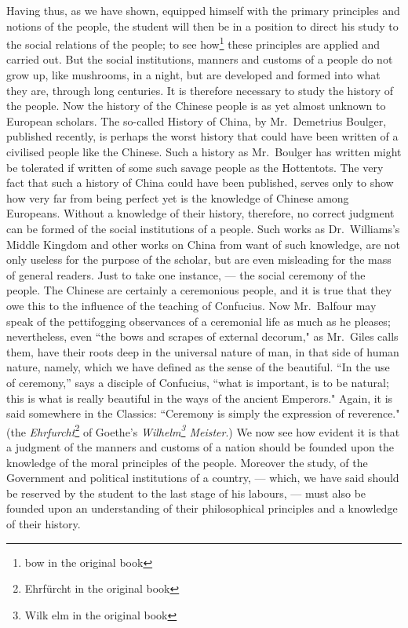 Having thus, as we have shown, equipped himself with the primary principles and notions of the people, the student will then be in a position to direct his study to the social relations of the people; to see how\footnote{bow in the original book} these principles are applied and carried out. 
But the social institutions, manners and customs of a people do not grow up, like mushrooms, in a night, but are developed and formed into what they are, through long centuries.
It is therefore necessary to study the history of the people.
Now the history of the Chinese people is as yet almost unknown to European scholars.
The so-called History of China, by Mr.~Demetrius Boulger, published recently, is perhaps the worst history that could have been written of a civilised people like the Chinese.
Such a history as Mr.~Boulger has written might be tolerated if written of some such savage people as the Hottentots.
The very fact that such a history of China could have been published, serves only to show how very far from being perfect yet is the knowledge of Chinese among Europeans.
Without a knowledge of their history, therefore, no correct judgment can be formed of the social institutions of a people.
Such works as Dr.~Williams's Middle Kingdom and other works on China from want of such knowledge, are not only useless for the purpose of the scholar, but are even misleading for the mass of general readers.
Just to take one instance, --- the social ceremony of the people.
The Chinese are certainly a ceremonious people, and it is true that they owe this to the influence of the teaching of Confucius.
Now Mr.~Balfour may speak of the pettifogging observances of a ceremonial life as much as he pleases; nevertheless, even ``the bows and scrapes of external decorum," as Mr.~Giles calls them, have their roots deep in the universal nature of man, in that side of human nature, namely, which we have defined as the sense of the beautiful.
``In the use of ceremony,'' says a disciple of Confucius, ``what is important, is to be natural; this is what is really beautiful in the ways of the ancient Emperors."
Again, it is said somewhere in the Classics: ``Ceremony is simply the expression of reverence." (the \emph{Ehrfurcht}\footnote{Ehrf\"urcht in the original book} of Goethe's \emph{Wilhelm\footnote{Wilk elm in the original book} Meister}.)
We now see how evident it is that a judgment of the manners and customs of a nation should be founded upon the knowledge of the moral principles of the people.
Moreover the study, of the Government and political institutions of a country, --- which, we have said should be reserved by the student to the last stage of his labours, --- must also be founded upon an understanding of their philosophical principles and a knowledge of their history.

